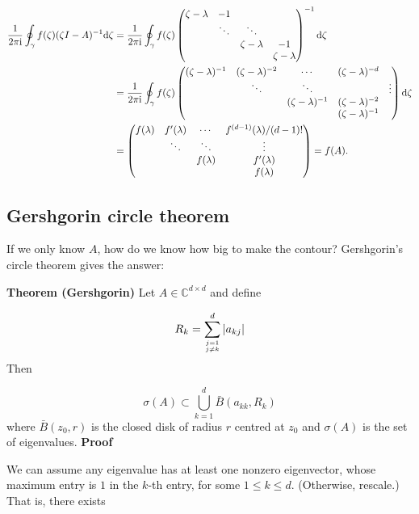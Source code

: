 \documentclass[12pt,landscape]{article}
\def\D{ {\rm d} }
\def\I{ {\rm i} }
\def\sopmatrix#1{ \begin{pmatrix}#1\end{pmatrix} }
\begin{document}
{\begin{align*}
{1 \over 2 \pi \I} \oint_\gamma f(\zeta)(\zeta I - A)^{-1} \D \zeta
&=
{1 \over 2 \pi \I} \oint_\gamma f(\zeta) \sopmatrix{\zeta - \lambda  & -1 \\
            & \ddots &\ddots \\
            &&\zeta - \lambda & -1 \\ &&& \zeta - \lambda}^{-1} \D \zeta \\
&=
{1 \over 2 \pi \I} \oint_\gamma f(\zeta) \sopmatrix{(\zeta-\lambda)^{-1} & (\zeta-\lambda)^{-2} & \cdots & (\zeta-\lambda)^{-d} \\
                                                                    & \ddots& \ddots&  &\vdots \\
                                                                    & & (\zeta-\lambda)^{-1} & (\zeta-\lambda)^{-2} \\
                                                                    &&& (\zeta-\lambda)^{-1}} \D \zeta \\
&= \begin{pmatrix} f(\lambda) & f'(\lambda) & \cdots & f^{(d-1)}(\lambda)/(d-1)! \\
        & \ddots & \ddots & \vdots \\
            & & f(\lambda) & f'(\lambda)\\
            &&& f(\lambda)
            \end{pmatrix} = f(A).
\end{align*}
\newpage
\subsection{Gershgorin circle theorem}
If we only know $A$, how do we know how big to make the contour? Gershgorin's circle theorem gives the answer:

\textbf{Theorem (Gershgorin)} Let $A \in {\mathbb C}^{d \times d}$ and define

\[
R_k = \sum_{j=1 \atop j \neq k}^d |a_{kj}|
\]
Then

\[
\sigma(A) \subset \bigcup_{k=1}^d \bar B(a_{kk}, R_k)
\]
where $\bar B(z_0, r)$ is the closed disk of radius $r$ centred at $z_0$ and $\sigma(A)$ is the set of eigenvalues.
\newpage
\textbf{Proof}

We can assume any eigenvalue has at least one nonzero eigenvector, whose maximum entry is $1$ in the $k$-th entry, for some $1 \leq k \leq d$. (Otherwise, rescale.) That is, there exists

}
\end{document}
